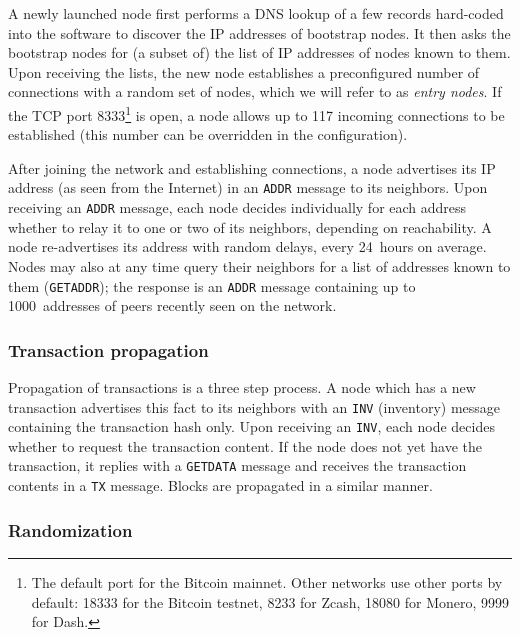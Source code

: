 A newly launched node first performs a DNS lookup of a few records hard-coded into the software to discover the IP addresses of bootstrap nodes.
It then asks the bootstrap nodes for (a subset of) the list of IP addresses of nodes known to them.
Upon receiving the lists, the new node establishes a preconfigured number of connections with a random set of nodes, which we will refer to as \textit{entry nodes}.
If the TCP port 8333\footnote{The default port for the Bitcoin mainnet. Other networks use other ports by default: 18333 for the Bitcoin testnet, 8233 for Zcash, 18080 for Monero, 9999 for Dash.} is open, a node allows up to 117 incoming connections to be established (this number can be overridden in the configuration).

After joining the network and establishing connections, a node advertises its IP address (as seen from the Internet) in an \texttt{ADDR} message to its neighbors.
Upon receiving an \texttt{ADDR} message, each node decides individually for each address whether to relay it to one or two of its neighbors, depending on reachability.
A node re-advertises its address with random delays, every 24~hours on average.
Nodes may also at any time query their neighbors for a list of addresses known to them (\texttt{GETADDR}); the response is an \texttt{ADDR} message containing up to 1000~addresses of peers recently seen on the network.

\subsubsection{Transaction propagation}

Propagation of transactions is a three step process.
A node which has a new transaction advertises this fact to its neighbors with an \texttt{INV} (inventory) message containing the transaction hash only.
Upon receiving an \texttt{INV}, each node decides whether to request the transaction content.
If the node does not yet have the transaction, it replies with a \texttt{GETDATA} message and receives the transaction contents in a \texttt{TX} message.
Blocks are propagated in a similar manner.

\subsubsection{Randomization}

